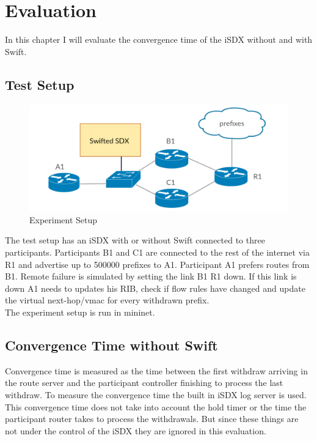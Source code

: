 \chapter{\label{chapter 4}Evaluation}

In this chapter I will evaluate the convergence time of the iSDX without and with Swift.

\section{\label{chapter4:Test Setup}Test Setup}

\begin{figure}[h]
\center
\includegraphics[scale = 0.36]{Figures/eval_exp_setup.pdf}
\caption{Experiment Setup}
\end{figure}


The test setup has an iSDX with or without Swift connected to three participants. Participants B1 and C1 are connected to the rest of the internet via R1 and advertise up to 500000 prefixes to A1. Participant A1 prefers routes from B1. Remote failure is simulated by setting the link B1 R1 down. If this link is down A1 needs to updates his RIB, check if flow rules have changed and update the virtual next-hop/vmac for every withdrawn prefix.\\ 
The experiment setup is run in mininet. 



\section{\label{chapter4:Convergence time without Swift}Convergence Time without Swift}

Convergence time is measured as the time between the first withdraw arriving in the route server and the participant controller finishing to process the last withdraw. To measure the convergence time the built in iSDX log server is used.\\
This convergence time does not take into account the hold timer or the time the participant router takes to process the withdrawals. But since these things are not under the control of the iSDX they are ignored in this evaluation.

